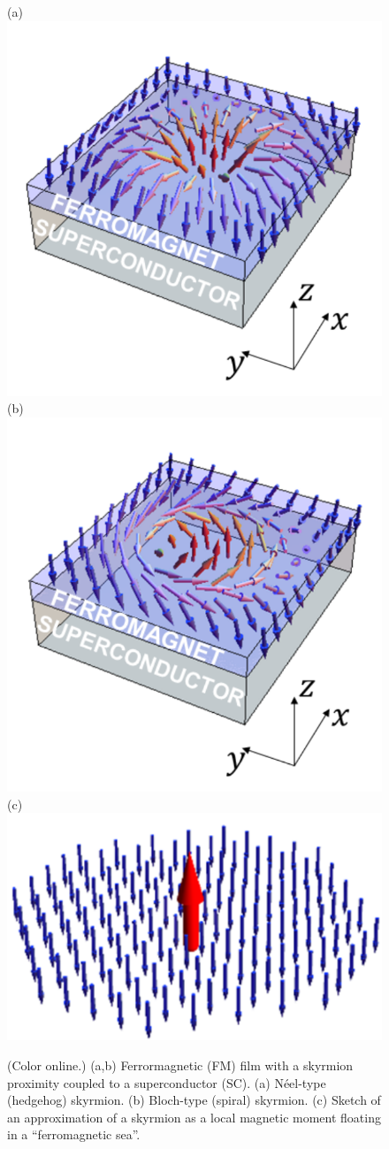 \documentclass[twocolumn,showpacs,floatfix,longbibliography]{revtex4-1}
\begin{document}
\begin{figure} \centering
(a) \includegraphics[width=0.4\linewidth]{SkyrmA}  
(b) \includegraphics[width=0.4\linewidth]{SkyrmB} \\
(c) \includegraphics[width=0.4\linewidth]{fig1c}
\caption{(Color online.) (a,b) Ferrormagnetic (FM) film with a skyrmion proximity coupled to a superconductor (SC). (a) N\'eel-type (hedgehog) skyrmion.  (b) Bloch-type (spiral) skyrmion. (c) Sketch of an approximation of a skyrmion as a local magnetic moment floating in a ``ferromagnetic sea''.} \label{fig:skyrmion}
\end{figure}
\end{document}
